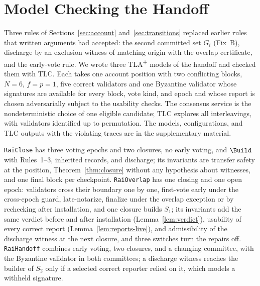 \section{Model Checking the Handoff}
\label{sec:mc}
Three rules of Sections~\ref{sec:account} and~\ref{sec:transitions} replaced earlier rules that written arguments had accepted: the second committed set $G_i$ (Fix~B), discharge by an exclusion witness of matching origin with the overlap certificate, and the early-vote rule. We wrote three TLA\textsuperscript{+} models of the handoff and checked them with TLC. Each takes one account position with two conflicting blocks, $N=6$, $f=p=1$, five correct validators and one Byzantine validator whose signatures are available for every block, vote kind, and epoch and whose report is chosen adversarially subject to the usability checks. The consensus service is the nondeterministic choice of one eligible candidate; TLC explores all interleavings, with validators identified up to permutation. The models, configurations, and TLC outputs with the violating traces are in the supplementary material.

\texttt{RaiClose} has three voting epochs and two closures, no early voting, and $\Build$ with Rules~1--3, inherited records, and discharge; its invariants are transfer safety at the position, Theorem~\ref{thm:closure} without any hypothesis about witnesses, and one final block per checkpoint. \texttt{RaiOverlap} has one closing and one open epoch: validators cross their boundary one by one, first-vote early under the cross-epoch guard, late-notarize, finalize under the overlap exception or by rechecking after installation, and one closure builds $S_1$; its invariants add the same verdict before and after installation (Lemma~\ref{lem:verdict}), usability of every correct report (Lemma~\ref{lem:reports-live}), and admissibility of the discharge witness at the next closure, and three switches turn the repairs off. \texttt{RaiHandoff} combines early voting, two closures, and a changing committee, with the Byzantine validator in both committees; a discharge witness reaches the builder of $S_2$ only if a selected correct reporter relied on it, which models a withheld signature.

